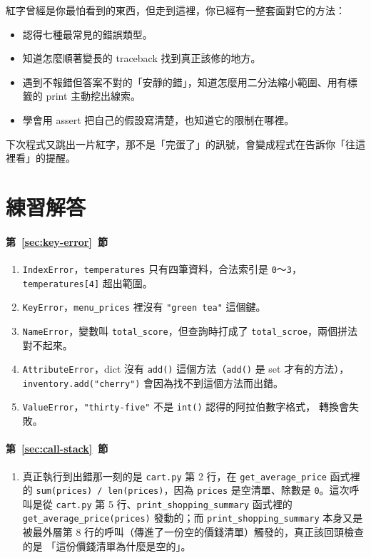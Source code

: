紅字曾經是你最怕看到的東西，但走到這裡，你已經有一整套面對它的方法：

\begin{itemize}
\item 認得七種最常見的錯誤類型。
\item 知道怎麼順著變長的 traceback 找到真正該修的地方。
\item 遇到不報錯但答案不對的「安靜的錯」，知道怎麼用二分法縮小範圍、用有標籤的 print
主動挖出線索。
\item 學會用 assert 把自己的假設寫清楚，也知道它的限制在哪裡。
\end{itemize}

下次程式又跳出一片紅字，那不是「完蛋了」的訊號，會變成程式在告訴你「往這裡看」的提醒。

\section*{練習解答}

\paragraph{第~\ref{sec:key-error}~節}
\begin{enumerate}
\item \texttt{IndexError}，\texttt{temperatures} 只有四筆資料，合法索引是
\texttt{0}～\texttt{3}，\texttt{temperatures[4]} 超出範圍。
\item \texttt{KeyError}，\texttt{menu\_prices} 裡沒有 \texttt{"green tea"} 這個鍵。
\item \texttt{NameError}，變數叫 \texttt{total\_score}，但查詢時打成了
\texttt{total\_scroe}，兩個拼法對不起來。
\item \texttt{AttributeError}，dict 沒有 \texttt{add()} 這個方法（\texttt{add()} 是
set 才有的方法），\texttt{inventory.add("cherry")} 會因為找不到這個方法而出錯。
\item \texttt{ValueError}，\texttt{"thirty-five"} 不是 \texttt{int()} 認得的阿拉伯數字格式，
轉換會失敗。
\end{enumerate}

\paragraph{第~\ref{sec:call-stack}~節}
\begin{enumerate}
\item 真正執行到出錯那一刻的是 \texttt{cart.py} 第 2 行，在 \texttt{get\_average\_price}
函式裡的 \texttt{sum(prices) / len(prices)}，因為 \texttt{prices} 是空清單、除數是
\texttt{0}。這次呼叫是從 \texttt{cart.py} 第 5 行、\texttt{print\_shopping\_summary}
函式裡的 \texttt{get\_average\_price(prices)} 發動的；而 \texttt{print\_shopping\_summary}
本身又是被最外層第 8 行的呼叫（傳進了一份空的價錢清單）觸發的，真正該回頭檢查的是
「這份價錢清單為什麼是空的」。
\end{enumerate}

